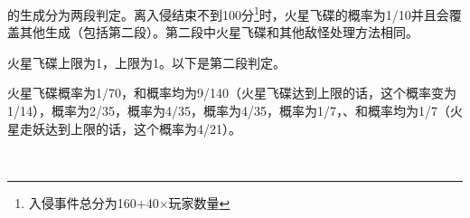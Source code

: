 \subsubsection{}
的生成分为两段判定。离入侵结束不到100分\footnote{入侵事件总分为160+40$\times$玩家数量}时，火星飞碟的概率为1/10并且会覆盖其他生成（包括第二段）。第二段中火星飞碟和其他敌怪处理方法相同。

火星飞碟上限为1，上限为1。以下是第二段判定。

火星飞碟概率为1/70，和概率均为9/140（火星飞碟达到上限的话，这个概率变为1/14），概率为2/35，概率为4/35，概率为4/35，概率为1/7，、和概率均为1/7（火星走妖达到上限的话，这个概率为4/21）。
\begin{figure}[!ht]
    \centering
    \\

\end{figure}
